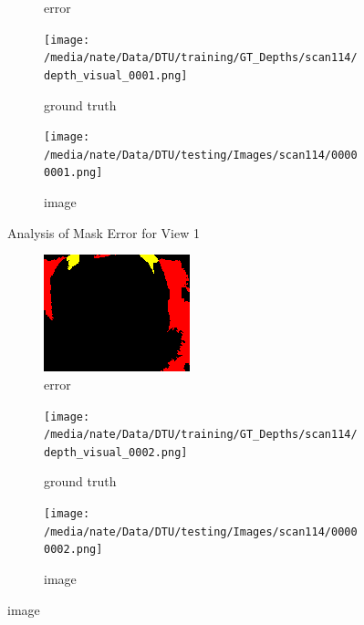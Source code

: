 \documentclass{article}
\begin{document}
\begin{figure}
\begin{subfigure}{0.3\textwidth}
		\caption{error}
		\label{fig:error1}
	\end{subfigure}
	\hfill
	\centering
	\begin{subfigure}{0.3\textwidth}
		\centering
		\texttt{[image: /media/nate/Data/DTU/training/GT\_Depths/scan114/depth\_visual\_0001.png]}
		\caption{ground truth}
		\label{fig:gt1}
	\end{subfigure}
	\hfill
	\centering
	\begin{subfigure}{0.3\textwidth}
		\centering
		\texttt{[image: /media/nate/Data/DTU/testing/Images/scan114/00000001.png]}
		\caption{image}
		\label{fig:img1}
	\end{subfigure}
	\hfill
	\caption{Analysis of Mask Error for View 1}
	\label{fig:error_analys1}
\end{figure}\begin{figure}
	\centering
	\begin{subfigure}{0.3\textwidth}
		\centering
		\includegraphics[width=\textwidth]{./output/002_error.png}
		\caption{error}
		\label{fig:error2}
	\end{subfigure}
	\hfill
	\centering
	\begin{subfigure}{0.3\textwidth}
		\centering
		\texttt{[image: /media/nate/Data/DTU/training/GT\_Depths/scan114/depth\_visual\_0002.png]}
		\caption{ground truth}
		\label{fig:gt2}
	\end{subfigure}
	\hfill
	\centering
	\begin{subfigure}{0.3\textwidth}
		\centering
		\texttt{[image: /media/nate/Data/DTU/testing/Images/scan114/00000002.png]}
		\caption{image}

\end{subfigure}
\end{figure}
\end{document}
